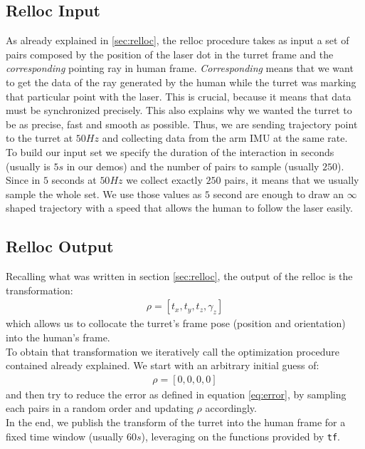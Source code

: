 \subsection{Relloc Input}
As already explained in \ref{sec:relloc}, the \ac{relloc} procedure takes as input a set of pairs composed by the position of the laser dot in the turret frame and the \emph{corresponding} pointing ray in human frame. \emph{Corresponding} means that we want to get the data of the ray generated by the human while the turret was marking that particular point with the laser. This is crucial, because it means that data must be synchronized precisely. This also explains why we wanted the turret to be  as precise, fast and smooth as possible. Thus, we are sending trajectory point to the turret at $50 Hz$ and collecting data from the arm \ac{IMU} at the same rate.\\
To build our input set we specify the duration of the interaction in seconds (usually is $5s$ in our demos) and the number of pairs to sample (usually $250$). Since in $5$ seconds at $50 Hz$ we collect exactly $250$ pairs, it means that we usually sample the whole set. We use those values as $5$ second are enough to draw an $\infty$ shaped trajectory with a speed that allows the human to follow the laser easily.
\subsection{Relloc Output}
Recalling what was written in section \ref{sec:relloc}, the output of the \ac{relloc} is the transformation:
\begin{align}
	\rho = [t_x, t_y, t_z, \gamma_z] \nonumber
\end{align}
which allows us to collocate the turret's frame pose (position and orientation) into the human's frame.\\
To obtain that transformation we iteratively call the optimization procedure contained already explained. We start with an arbitrary initial guess of:
\begin{align}
	\rho = [0, 0, 0, 0] \nonumber
\end{align}
and then try to reduce the error as defined in equation \ref{eq:error}, by sampling each pairs in a random order and updating $\rho$ accordingly.\\
In the end, we publish the transform of the turret into the human frame for a fixed time window (usually $60s$), leveraging on the functions provided by \texttt{tf}.
